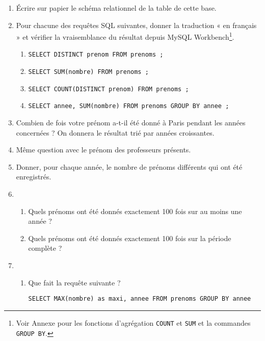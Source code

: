 \begin{enumerate}
\item Écrire sur papier le schéma relationnel de la table de cette base.
\item Pour chacune des requêtes SQL suivantes, donner la traduction « en français » et vérifier la vraisemblance du résultat depuis MySQL Workbench\footnote{Voir Annexe pour les fonctions d'agrégation \texttt{COUNT} et \texttt{SUM} et la commandes \texttt{GROUP BY}.}.

\begin{enumerate}
\item  \verb|SELECT DISTINCT prenom FROM prenoms ;|
\item  \verb|SELECT SUM(nombre) FROM prenoms ;|
\item  \verb|SELECT COUNT(DISTINCT prenom) FROM prenoms ;|
\item  \verb|SELECT annee, SUM(nombre) FROM prenoms GROUP BY annee ;|
\end{enumerate}

\item Combien de fois votre prénom a-t-il été donné à Paris pendant les années concernées ? On donnera le résultat trié par années croissantes.

\item Même question avec le prénom des professeurs présents. 

\item Donner, pour chaque année, le nombre de prénoms différents qui ont été enregistrés.

\item 
    \begin{enumerate}
    
    \item Quels prénoms ont été donnés exactement 100 fois sur au moins une année ?
    
    \item Quels prénoms ont été donnés exactement 100 fois sur la période complète ?
                                                                                                                                                                                      \end{enumerate}

\item 
    \begin{enumerate}
    \item Que fait la requête suivante ?
    
    \verb|SELECT MAX(nombre) as maxi, annee FROM prenoms GROUP BY annee|
    \end{enumerate}
    

\end{enumerate}

